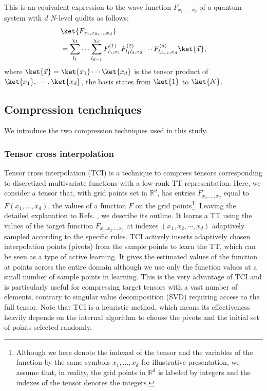 This is an equivalent expression to the wave function $F_{x_1, \ldots, x_d}$ of a quantum system with $d$ $N$-level qudits as follows:
\begin{align}
    &\ket{F_{x_1, x_2,\ldots, x_d}} \nonumber \\
    &= \sum_{l_1}^{\chi_1} \cdots \sum_{l_{d-1}}^{\chi_d} F_{l_1, x_1}^{(1)} F_{l_1 l_2, x_2}^{(2)} \cdots F_{l_{d-1}, x_d}^{(d)} 
    \ket{\vec{x}},
\end{align}
where $\ket{\vec{x}}=\ket{x_1}\cdots\ket{x_d}$ is the tensor product of $\ket{x_1},\cdots,\ket{x_d}$, the basis states from $\ket{1}$ to $\ket{N}$.

\subsection{Compression tenchniques}\label{subsec:comp}
We introduce the two compression techniques used in this study.

\subsubsection{Tensor cross interpolation}
Tensor cross interpolation (TCI) is a technique to compress tensors corresponding to
discretized multivariate functions with a low-rank TT representation.
Here, we consider a tensor that, with grid points set in $\mathbb{R}^d$, has entries $F_{x_1,\ldots,x_d}$ equal to $F(x_1,\ldots,x_d)$, the values of a function $F$ on the grid points\footnote{Although we here denote the indexed of the tensor and the variables of the function by the same symbols $x_1,\ldots,x_d$ for illustrative presentation, we assume that, in reality, the grid points in $\mathbb{R}^d$ is labeled by integers and the indexes of the tensor denotes the integers.}.
Leaving the detailed explanation to Refs. \cite{Oseledets2010-fg,Dolgov2020-yi, Nunez_Fernandez2022-fo, Ritter2024-pr}, we describe its outline.
It learns a TT using the values of the target function $F_{x_1, x_2\ldots, x_d}$ at indexes $(x_1,x_2,\cdots,x_d)$ adaptively sampled according to the specific rules. 
TCI actively inserts adaptively chosen interpolation points (pivots) from the sample points to learn the TT, which can be seen as a type of active learning.
It gives the estimated values of the function at points across the entire domain although we use only the function values at a small number of sample points in learning.
This is the very advantage of TCI and is particularly useful for compressing target tensors with a vast number of elements, contrary to singular value decomposition (SVD) requiring access to the full tensor.
Note that TCI is a heuristic method, which means its effectiveness heavily depends on the internal algorithm to choose the pivots and the initial set of points selected randomly.


